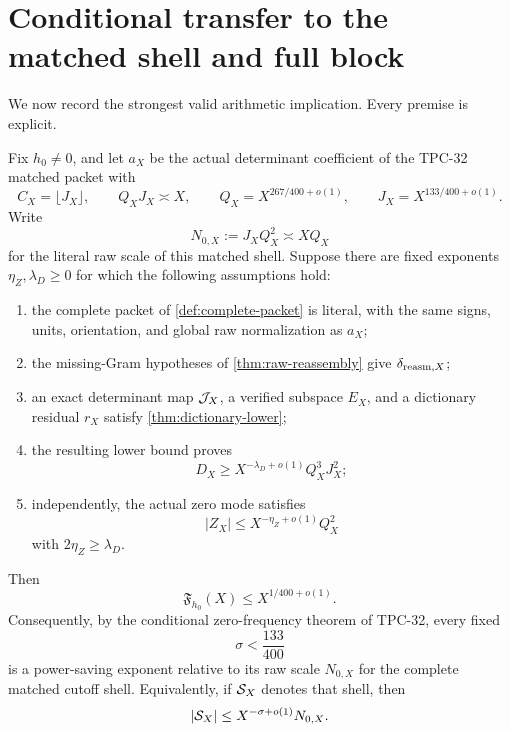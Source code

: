 \section{Conditional transfer to the matched shell and full block}
\label{sec:full-block}

We now record the strongest valid arithmetic implication.  Every
premise is explicit.

\begin{theorem}
\label{thm:literal-flatness-transfer}
Fix \(h_0\ne0\), and let \(a_X\) be the actual determinant coefficient
of the TPC-32 matched packet with
\[
 C_X=\lfloor J_X\rfloor,\qquad
 Q_XJ_X\asymp X,\qquad
 Q_X=X^{267/400+o(1)},\qquad
 J_X=X^{133/400+o(1)}.
\]
Write
\begin{equation}
 N_{0,X}:=J_XQ_X^2\asymp XQ_X
 \label{eq:matched-raw-scale}
\end{equation}
for the literal raw scale of this matched shell.  Suppose there are
fixed exponents \(\eta_Z,\lambda_D\ge0\) for which the following
assumptions hold:
\begin{enumerate}[label=(T\arabic*),leftmargin=2.7em]
\item the complete packet of \cref{def:complete-packet} is literal,
with the same signs, units, orientation, and global raw normalization
as \(a_X\);
\item the missing-Gram hypotheses of
\cref{thm:raw-reassembly} give
\(\delta_{{\rm reasm},X}\);
\item an exact determinant map \(\mathcal J_X\), a verified subspace \(E_X\),
and a dictionary residual \(r_X\) satisfy
\cref{thm:dictionary-lower};
\item the resulting lower bound proves
\[
 D_X\ge X^{-\lambda_D+o(1)}Q_X^3J_X^2;
 \]
\item independently, the actual zero mode satisfies
\[
 |Z_X|\le X^{-\eta_Z+o(1)}Q_X^2
 \]
with \(2\eta_Z\ge\lambda_D\).
\end{enumerate}
Then
\begin{equation}
 \mathfrak F_{h_0}(X)\le X^{1/400+o(1)}.
 \label{eq:literal-flatness-output}
\end{equation}
Consequently, by the conditional zero-frequency theorem of TPC-32,
every fixed
\begin{equation}
 \sigma<\frac{133}{400}
 \label{eq:matched-saving}
\end{equation}
is a power-saving exponent relative to its raw scale \(N_{0,X}\) for
the complete matched cutoff shell.
Equivalently, if \(\mathcal S_X\) denotes that shell, then
\begin{equation}
 |\mathcal S_X|\le X^{-\sigma+o(1)}N_{0,X}.
 \label{eq:matched-shell-bound}
\end{equation}
\end{theorem}

